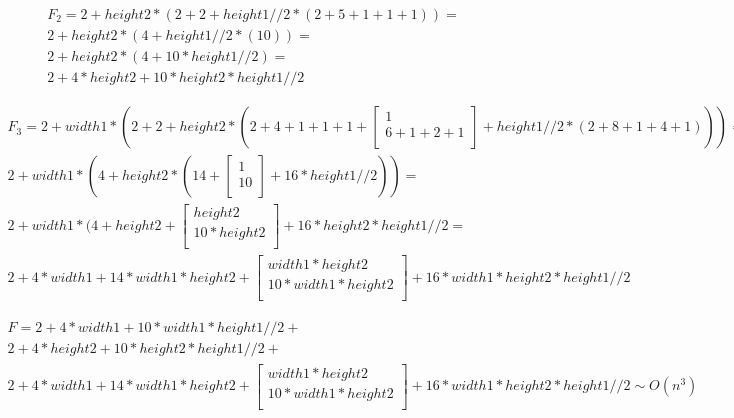 \documentclass[a4paper,12pt]{report}
\begin{document}
        	\begin{multline*}
        		F_{2} = 2+height2*(2+2+height1//2*(2+5+1+1+1)) = \\2+height2*(4+height1//2*(10)) =\\ 2+height2*(4+10*height1//2) =\\ 2+4*height2+10*height2*height1//2
        	\end{multline*}
        	
        	\begin{multline*}
        		F_{3} = 2+width1*(2+2+height2*(2+4+1+1+1+
        		\left[ 
        			\begin{gathered} 
        				1\\
        				6+1+2+1\\ 
        			\end{gathered} 
        		\right] +height1//2*(2+8+1+4+1))) = \\2+width1*(4+height2*(14+
        		\left[ 
        			\begin{gathered} 
        				1\\
        				10\\ 
        			\end{gathered} 
        		\right] +16*height1//2)) =\\ 2+width1*(4+height2+
        		\left[ 
        			\begin{gathered} 
        				height2\\
        				10*height2\\ 
        			\end{gathered} 
        		\right] + 16*height2*height1//2 =\\ 2+4*width1+14*width1*height2+
        		\left[ 
        			\begin{gathered} 
        				width1*height2\\
        				10*width1*height2\\ 
        			\end{gathered} 
        		\right] +16*width1*height2*height1//2
        	\end{multline*}
        	
        	\begin{multline*}
        		F = 2+4*width1+10*width1*height1//2+\\
        		2+4*height2+10*height2*height1//2+\\
        		2+4*width1+14*width1*height2+
        		\left[ 
        			\begin{gathered} 
        				width1*height2\\
        				10*width1*height2\\ 
        			\end{gathered} 
        		\right] +16*width1*height2*height1//2 \sim O(n^{3})
        	\end{multline*}
\end{document}
